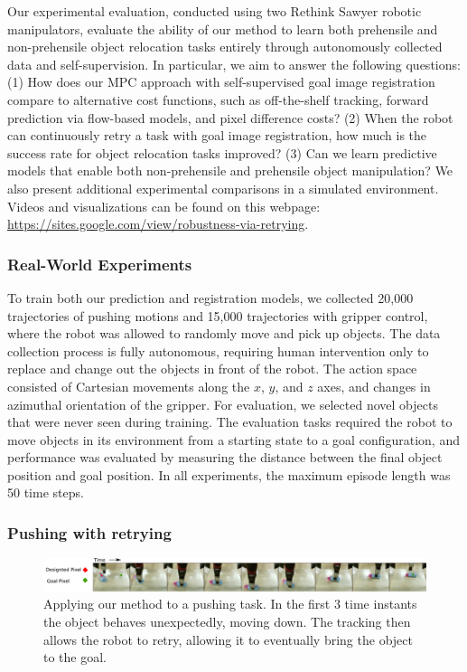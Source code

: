 Our experimental evaluation, conducted using two Rethink Sawyer robotic manipulators, evaluate the ability of our method to learn both prehensile and non-prehensile object relocation tasks entirely through autonomously collected data and self-supervision. In particular, we aim to answer the following questions: (1) How does our MPC approach with self-supervised goal image registration compare to alternative cost functions, such as off-the-shelf tracking, forward prediction via flow-based models, and pixel difference costs? (2) When the robot can continuously retry a task with goal image registration, how much is the success rate for object relocation tasks improved? (3) Can we learn predictive models that enable both non-prehensile and prehensile object manipulation? We also present additional experimental comparisons in a simulated environment.
Videos and visualizations can be found on this webpage: \url{https://sites.google.com/view/robustness-via-retrying}.

\subsubsection{Real-World Experiments}

To train both our prediction and registration models, we collected 20,000 trajectories of pushing motions and 15,000 trajectories with gripper control, where the robot was allowed to randomly move and pick up objects. The data collection process is fully autonomous, requiring human intervention only to replace and change out the objects in front of the robot.
The action space consisted of Cartesian movements along the $x$, $y$, and $z$ axes, and changes in azimuthal orientation of the gripper. For evaluation, we selected novel objects that were never seen during training. The evaluation tasks required the robot to move objects in its environment from a starting state to a goal configuration, and performance was evaluated by measuring the distance between the final object position and goal position. In all experiments, the maximum episode length was 50 time steps.

\subsubsection{Pushing with retrying}
\begin{figure}
    \centering
    \includegraphics[width=1.0\textwidth]{images_rfr/push_correction.pdf}
    \caption{\small{Applying our method to a pushing task. In the first 3 time instants the object behaves unexpectedly, moving down. The tracking then allows the robot to retry, allowing it to eventually bring the object to the goal.}}
    \label{fig:push_retry}
\end{figure}

